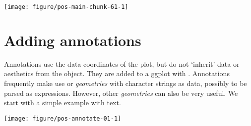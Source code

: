 \documentclass[krantz2]{krantz}\usepackage{knitr}%
\begin{document}
\begin{knitrout}\footnotesize
{}\color{fgcolor}\begin{kframe}
\begin{alltt}
  \hlopt{+} \hlstd{()} \hlopt{+}
  \hlstd{(}
    \hlstd{,}
     \hlstd{=} \hlstd{(}\hlopt{~}   \hlstd{=} \hlstd{,}  \hlstd{=} \hlstd{(}\hlstd{,} \hlstd{))}
  \hlstd{)}
\end{alltt}
\end{kframe}

{\centering \texttt{[image: figure/pos-main-chunk-61-1]} 

}



\end{knitrout}

\section{Adding annotations}
Annotations use the data coordinates of the plot, but do not `inherit' data or aesthetics from the  object. They are added to a ggplot with . Annotations frequently make use  or  \emph{geometries} with character strings as data, possibly to be parsed as expressions. However, other \emph{geometries} can also be very useful. We start with a simple example with text.

\begin{knitrout}\footnotesize
{}\color{fgcolor}\begin{kframe}
\begin{alltt}
  \hlopt{+}
  \hlstd{()} \hlopt{+}
  \hlstd{(} \hlstd{=} \hlstd{,}
            \hlstd{=} \hlstd{,}
            \hlstd{=} \hlstd{,}  \hlstd{=} \hlstd{,}
            \hlstd{=} \hlstd{,}
           \hlstd{=}\hlstd{)}
\end{alltt}
\end{kframe}

{\centering \texttt{[image: figure/pos-annotate-01-1]} 

}



\end{knitrout}
\end{document}
